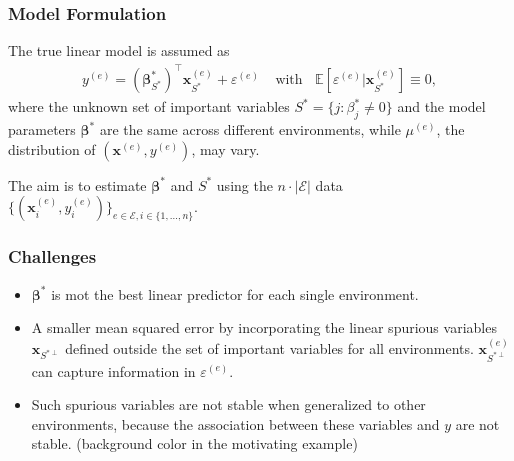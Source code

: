 \begin{frame}
  \frametitle{Model Formulation}
  The true linear model is assumed as
  \begin{align}
    \label{main_eq}
    y^{(e)} = (\bm\beta^*_{S^*})^\top \bm x_{S^*}^{(e)} + \varepsilon^{(e)} ~~~~~ \text{with} ~~~~ \mathbb{E}[\varepsilon^{(e)}|\bm x_{S^*}^{(e)}] \equiv 0,
  \end{align} where the unknown set of important variables $S^* = \{j: \beta_j^* \neq 0\}$ and the model parameters $\bm \beta^*$ are the same across different environments, while $\mu^{(e)}$, the distribution of $(\bm x^{(e)},y^{(e)})$, may vary.
  
  \vspace{8pt}

  The aim is to estimate $\bm\beta^*$ and $S^*$ using the $n\cdot |\mathcal{E}|$ data $\{(\bm x_i^{(e)}, y_i^{(e)})\}_{e\in \mathcal{E}, i\in \{1,\ldots, n\}}$.
\end{frame}

\begin{frame}
  \frametitle{Challenges}
  \begin{itemize}
  \item $\bm \beta^*$ is mot the best linear predictor for each single environment.
  \item A smaller mean squared error by incorporating the linear spurious variables $\bm x_{S^{*\perp}}$ defined outside the set of important variables for all environments.
    $\bm x_{S^{*\perp}}^{(e)}$ can capture information in $\varepsilon^{(e)}$.
  \item Such spurious variables are not stable when generalized to other environments, because the association between these variables and $y$ are not stable. (background color in the motivating example)
  \end{itemize}
\end{frame}

